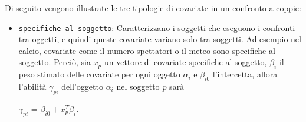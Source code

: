 Di seguito vengono illustrate le tre tipologie di covariate in un confronto a coppie:
\begin{itemize}
	\item \texttt{specifiche al soggetto}: Caratterizzano i soggetti che eseguono i confronti tra oggetti, e quindi queste covariate variano solo tra soggetti. Ad esempio nel calcio, covariate come il numero spettatori o il meteo sono specifiche al soggetto. Perciò, sia $x_p$ un vettore di covariate specifiche al soggetto, $\beta_i$ il peso stimato delle covariate per ogni oggetto $\alpha_{i}$ e $\beta_{i0}$ l'intercetta, allora l'abilità $\gamma_{pi}$ dell'oggetto $\alpha_{i}$ nel soggetto \emph{p} sarà
	\begin{center}
		$ \gamma_{pi}$ = $\beta_{i0} + x^{T}_{p}\beta_i$.
	\end{center}


\end{itemize}
